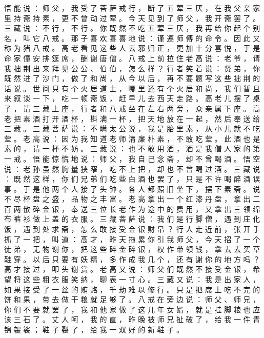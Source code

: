 {悟 能 说 ： 师 父 ， 我 受 了 菩 萨 戒 行 ， 断 了 五 荤 三 厌 ， 在 我 父 亲 家 里 持 斋 持 素 ， 更 不 曾 动 过 荤 。
今 天 见 到 了 师 父 ， 我 开 斋 罢 了 。
三 藏 说 ： 不 行 ， 不 行 。
你 既 然 不 吃 五 荤 三 厌 ， 我 再 给 你 起 个 别 名 ， 叫 它 八 戒 。
那 子 喜 欢 喜 喜 地 说 ： 谨 遵 师 傅 的 命 令 。
因 此 又 称 为 猪 八 戒 。
高 老 看 见 这 些 人 去 邪 归 正 ， 更 加 十 分 喜 悦 ， 于 是 命 家 僮 安 排 筵 席 ， 酬 谢 唐 僧 。
八 戒 上 前 拉 住 老 高 说 ： 老 爷 ， 请 我 拙 荆 出 来 拜 见 公 公 、 伯 伯 ， 怎 么 样 ？ 行 者 笑 着 说 ： 贤 弟 ， 你 既 然 进 了 沙 门 ， 做 了 和 尚 ， 从 今 以 后 ， 再 不 要 题 写 这 些 拙 荆 的 话 说 。
世 间 只 有 个 火 居 道 士 ， 哪 里 还 有 个 火 居 和 尚 ， 我 们 暂 且 来 叙 谈 一 下 ， 吃 一 顿 斋 饭 ， 赶 早 儿 去 西 天 走 路 。
高 老 儿 摆 了 桌 子 ， 请 三 藏 上 座 ， 行 者 和 八 戒 坐 在 左 右 两 旁 ， 众 亲 属 下 座 。
高 老 把 素 酒 打 开 酒 杯 ， 斟 满 一 杯 ， 把 天 地 放 在 一 起 ， 然 后 奉 送 给 三 藏 。
三 藏 菩 萨 说 ： 不 瞒 太 公 说 ， 我 是 胎 里 素 ， 从 小 儿 就 不 吃 荤 。
老 高 说 ： 因 为 我 知 道 老 师 清 廉 朴 素 ， 不 敢 吃 荤 。
此 酒 也 是 素 的 ， 请 一 杯 不 妨 。
三 藏 说 ： 也 不 敢 用 酒 ， 酒 是 我 僧 人 家 的 第 一 戒 。
悟 能 惊 慌 地 说 ： 师 父 ， 我 自 己 念 斋 ， 却 不 曾 喝 酒 。
悟 空 说 ： 老 孙 虽 然 胸 量 狭 窄 ， 吃 不 上 把 ， 却 也 不 曾 喝 过 酒 。
三 藏 说 ： 既 然 这 样 ， 你 们 兄 弟 们 吃 些 白 酒 也 罢 了 ， 只 是 不 许 喝 醉 酒 误 事 。
于 是 他 两 个 人 接 了 头 钟 。
各 人 都 照 旧 坐 下 ， 摆 下 素 斋 。
说 不 尽 杯 盘 之 盛 ， 品 物 之 丰 富 。
老 高 拿 出 一 个 红 漆 丹 盘 ， 拿 出 二 百 两 散 碎 金 银 ， 奉 送 三 位 长 老 作 为 途 中 的 费 用 ， 又 拿 出 三 领 绵 布 裤 衫 做 上 盖 的 衣 服 。
三 藏 菩 萨 说 ： 我 们 是 行 脚 僧 ， 遇 到 庄 化 饭 ， 遇 到 处 求 斋 ， 怎 么 敢 接 受 金 银 财 帛 ？ 行 人 走 近 前 ， 张 开 手 抓 了 一 把 ， 叫 道 ： 高 才 ， 昨 天 拖 累 你 引 我 师 父 ， 今 天 招 了 一 个 徒 弟 ， 无 物 谢 你 ， 把 这 些 碎 金 碎 银 ， 权 作 带 领 钱 ， 拿 去 去 买 草 鞋 穿 。
以 后 只 要 有 妖 精 ， 多 作 成 我 几 个 ， 还 有 谢 你 的 地 方 吗 ？
高 才 接 过 ， 叩 头 谢 赏 。
老 高 又 说 ： 师 父 们 既 然 不 接 受 金 银 ， 希 望 将 这 些 粗 衣 服 笑 纳 ， 聊 表 一 寸 心 。
三 藏 又 说 ： 我 是 出 家 人 ， 如 果 接 受 了 一 丝 的 贿 赂 ， 千 劫 难 以 修 行 。
只 是 把 席 上 吃 不 完 的 饼 和 果 ， 带 去 做 干 粮 就 足 够 了 。
八 戒 在 旁 边 说 ： 师 父 、 师 兄 ， 你 们 不 要 就 罢 了 ， 我 和 他 家 做 了 这 几 年 女 婿 ， 就 是 挂 脚 粮 也 应 该 三 石 了 。
丈 人 呵 ， 我 的 直 ， 昨 晚 被 师 兄 扯 破 了 ， 给 我 一 件 青 锦 袈 裟 ； 鞋 子 裂 了 ， 给 我 一 双 好 的 新 鞋 子 。
}
